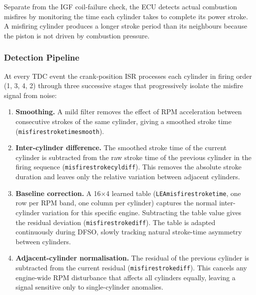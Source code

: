 \documentclass[a4paper,11pt]{article}
\renewcommand{\_}{\oldunderscore\allowbreak}
\begin{document}
Separate from the IGF coil-failure check, the ECU detects actual combustion
misfires by monitoring the time each cylinder takes to complete its power
stroke. A misfiring cylinder produces a longer stroke period than its
neighbours because the piston is not driven by combustion pressure.

\subsubsection*{Detection Pipeline}

At every TDC event the crank-position ISR processes each cylinder in firing
order (1, 3, 4, 2) through three successive stages that progressively isolate
the misfire signal from noise:

\begin{enumerate}
  \item \textbf{Smoothing.} A mild filter removes the effect of RPM
        acceleration between consecutive strokes of the same cylinder, giving a
        smoothed stroke time (\texttt{misfire\_stroke\_time\_smooth}).

  \item \textbf{Inter-cylinder difference.} The smoothed stroke time of the
        current cylinder is subtracted from the raw stroke time of the previous
        cylinder in the firing sequence (\texttt{misfire\_stroke\_cyl\_diff}).
        This removes the absolute stroke duration and leaves only the
        relative variation between adjacent cylinders.

  \item \textbf{Baseline correction.} A 16$\times$4 learned table
        (\texttt{LEA\_misfire\_stroke\_time}, one row per RPM band, one column
        per cylinder) captures the normal inter-cylinder variation for this
        specific engine. Subtracting the table value gives the residual
        deviation (\texttt{misfire\_stroke\_diff\_1}). The table is adapted
        continuously during DFSO, slowly tracking natural stroke-time asymmetry
        between cylinders.

  \item \textbf{Adjacent-cylinder normalisation.} The residual of the previous
        cylinder is subtracted from the current residual
        (\texttt{misfire\_stroke\_diff\_2}). This cancels any engine-wide RPM
        disturbance that affects all cylinders equally, leaving a signal
        sensitive only to single-cylinder anomalies.
\end{enumerate}
\end{document}
